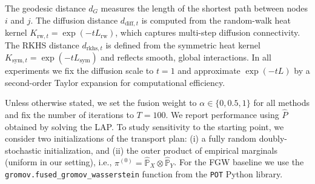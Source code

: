 \documentclass{article}
\begin{document}
The geodesic distance $d_G$ measures the length of the shortest path between nodes $i$ and $j$. The diffusion distance $d_{\mathrm{diff},t}$ is computed from the random-walk heat kernel $K_{\mathrm{rw},t} = \exp(-tL_{\mathrm{rw}})$, which captures multi-step diffusion connectivity. The RKHS distance $d_{\mathrm{rkhs},t}$ is defined from the symmetric heat kernel $K_{\mathrm{sym},t} = \exp(-tL_{\mathrm{sym}})$ and reflects smooth, global interactions. In all experiments we fix the diffusion scale to $t=1$ and approximate $\exp(-tL)$ by a second-order Taylor expansion for computational efficiency.

Unless otherwise stated, we set the fusion weight to $\alpha \in \{0, 0.5, 1\}$ for all methods and fix the number of iterations to $T = 100$. We report performance using $\hat{P}$ obtained by solving the LAP. To study sensitivity to the starting point, we consider two initializations of the transport plan:
(i) a fully random doubly-stochastic initialization, and
(ii) the outer product of empirical marginals (uniform in our setting), i.e., $\pi^{(0)} = \hat{\mathbb{P}}_X \otimes \hat{\mathbb{P}}_Y$. For the FGW baseline we use the \texttt{gromov.fused\_gromov\_wasserstein} function from the \texttt{POT} Python library.
\end{document}
